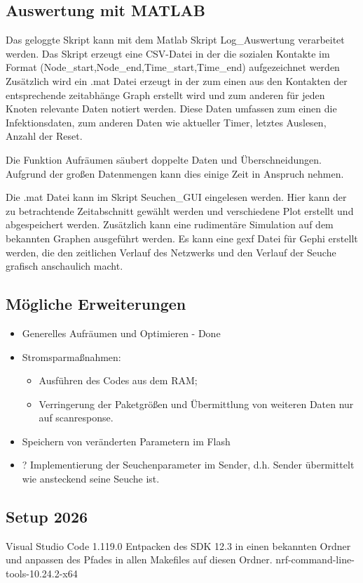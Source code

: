 \documentclass[11pt,ngerman]{scrartcl} %
\begin{document}
\subsection{Auswertung mit MATLAB}

Das geloggte Skript kann mit dem Matlab Skript Log\_Auswertung verarbeitet werden. Das Skript erzeugt eine CSV-Datei in der die sozialen Kontakte im Format (Node\_start,Node\_end,Time\_start,Time\_end)  aufgezeichnet werden
Zusätzlich wird ein .mat Datei erzeugt in der zum einen aus den Kontakten der entsprechende zeitabhänge Graph erstellt wird und zum anderen für jeden Knoten relevante Daten notiert werden. Diese Daten umfassen zum einen die Infektionsdaten, zum anderen Daten wie aktueller Timer, letztes Auslesen, Anzahl der Reset. 

Die Funktion Aufräumen säubert doppelte Daten und Überschneidungen. Aufgrund der großen Datenmengen kann dies einige Zeit in Anspruch nehmen.

Die .mat Datei kann im Skript Seuchen\_GUI eingelesen werden. Hier kann der zu betrachtende Zeitabschnitt gewählt werden und verschiedene Plot erstellt und abgespeichert werden. Zusätzlich kann eine rudimentäre Simulation auf dem bekannten Graphen ausgeführt werden.
Es kann eine gexf Datei für Gephi erstellt werden, die den zeitlichen Verlauf des Netzwerks und den Verlauf der Seuche grafisch anschaulich macht.


\subsection{Mögliche Erweiterungen}
\begin{itemize}
\item  Generelles Aufräumen und Optimieren - Done
\item  Stromsparmaßnahmen: 
\begin{itemize}
\item 	Ausführen des Codes aus dem RAM; 
\item Verringerung der Paketgrößen und Übermittlung von weiteren Daten nur auf scanresponse. 
\end{itemize} 
\item  Speichern von veränderten Parametern im Flash
\item  ? Implementierung der Seuchenparameter im Sender, d.h. Sender übermittelt wie ansteckend seine Seuche ist.
\end{itemize}

\subsection{Setup 2026}
Visual Studio Code 1.119.0
Entpacken des SDK 12.3 in einen bekannten Ordner und anpassen des Pfades in allen Makefiles auf diesen Ordner.
nrf-command-line-tools-10.24.2-x64
\end{document}
